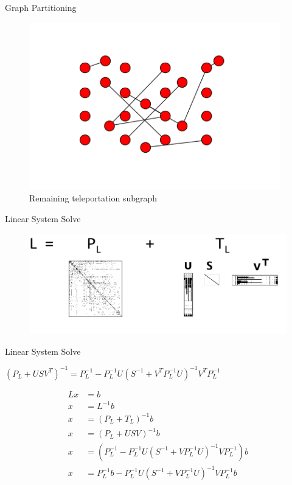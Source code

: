 \documentclass[xcolor=dvipsnames,10pt]{beamer}
\begin{document}
\begin{frame}{Graph Partitioning}
\vspace{-.2in}
\begin{figure}
\begin{center}
\hspace*{15pt} \includegraphics[width = 4.3in]{tgraph.png}
\caption{Remaining teleportation subgraph}
\end{center}
\end{figure}
\end{frame}

\begin{frame}{Linear System Solve}


\begin{figure}
\begin{center}
\includegraphics[width = 4.7in]{svd.png}
\end{center}
\end{figure}

\end{frame}
\begin{frame}{Linear System Solve}
\begin{Definition}
$(P_L + USV^T)^{-1} = P_L^{-1}  - P_L^{-1}U(S^{-1} + V^{T}P_L^{-1}U)^{-1}V^{T}P_L^{-1}$
\end{Definition}
\Large
\vspace{.05in}
\begin{align*}
Lx & = b\\
x & = L^{-1}b\\
x & = (P_L+T_L)^{-1}b\\
x & = (P_L+USV)^{-1}b\\
x & = (P_L^{-1}-P_L^{-1}U(S^{-1}+VP_L^{-1}U)^{-1}VP_L^{-1})b\\
x & = P_L^{-1}b-P_L^{-1}U(S^{-1}+VP_L^{-1}U)^{-1}VP_L^{-1}b\\
\end{align*}
\normalsize
\end{frame}
\end{document}
